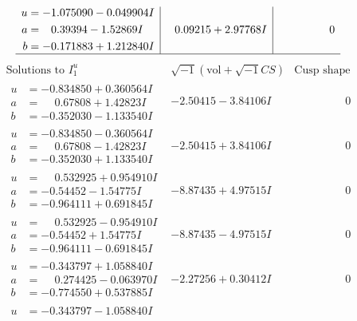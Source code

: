 \documentclass[1p]{elsarticle_modified}
\theoremstyle{definition}
\newcommand{\I}{\sqrt{-1}}
\begin{document}
$$\begin{array}{c|c|c}
\begin{aligned}
u &= -1.075090 - 0.049904 I \\
a &= \phantom{-}0.39394 - 1.52869 I \\
b &= -0.171883 + 1.212840 I\end{aligned}
 & \phantom{-}0.09215 + 2.97768 I & \phantom{-0.000000 } 0\\
 \hline 
 \end{array}$$\newpage$$\begin{array}{c|c|c}  
\text{Solutions to }I^u_{1}& \I (\text{vol} + \sqrt{-1}CS) & \text{Cusp shape}\\
 \hline 
\begin{aligned}
u &= -0.834850 + 0.360564 I \\
a &= \phantom{-}0.67808 + 1.42823 I \\
b &= -0.352030 - 1.133540 I\end{aligned}
 & -2.50415 - 3.84106 I & \phantom{-0.000000 } 0 \\ \hline\begin{aligned}
u &= -0.834850 - 0.360564 I \\
a &= \phantom{-}0.67808 - 1.42823 I \\
b &= -0.352030 + 1.133540 I\end{aligned}
 & -2.50415 + 3.84106 I & \phantom{-0.000000 } 0 \\ \hline\begin{aligned}
u &= \phantom{-}0.532925 + 0.954910 I \\
a &= -0.54452 - 1.54775 I \\
b &= -0.964111 + 0.691845 I\end{aligned}
 & -8.87435 + 4.97515 I & \phantom{-0.000000 } 0 \\ \hline\begin{aligned}
u &= \phantom{-}0.532925 - 0.954910 I \\
a &= -0.54452 + 1.54775 I \\
b &= -0.964111 - 0.691845 I\end{aligned}
 & -8.87435 - 4.97515 I & \phantom{-0.000000 } 0 \\ \hline\begin{aligned}
u &= -0.343797 + 1.058840 I \\
a &= \phantom{-}0.274425 - 0.063970 I \\
b &= -0.774550 + 0.537885 I\end{aligned}
 & -2.27256 + 0.30412 I & \phantom{-0.000000 } 0 \\ \hline\begin{aligned}
u &= -0.343797 - 1.058840 I \\

\end{aligned}
\end{array}$$
\end{document}
